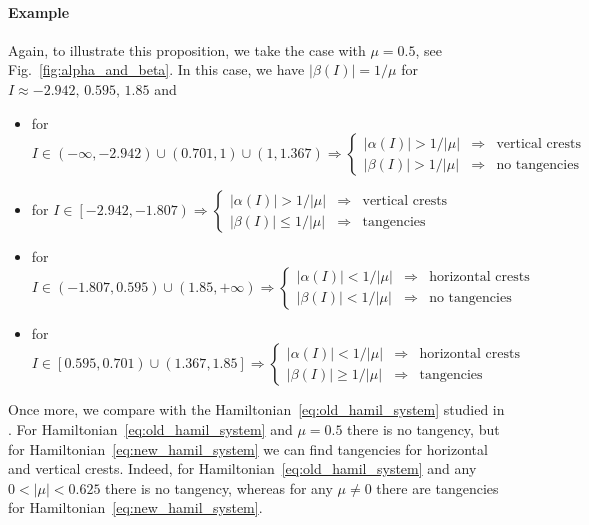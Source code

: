 \documentclass[a4paper,10pt]{article}
\theoremstyle{definition}
\begin{document}
\paragraph{Example} Again, to illustrate this proposition, we take the case with $\mu = 0.5$, see Fig.~\ref{fig:alpha_and_beta}.
In this case, we have $\left|\beta(I)\right| = 1/\mu$ for $I \approx -2.942,\, 0.595,\, 1.85$
and
\begin{itemize}
\item for $I \in (-\infty , -2.942)\cup \left(0.701 , 1\right)\cup(1 , 1.367)\Rightarrow \left\{\begin{matrix}
 \left|\alpha(I)\right| > 1/\left|\mu\right|& \Rightarrow  & \text{vertical crests} \\
\left|\beta(I)\right| > 1/\left|\mu\right| &  \Rightarrow & \text{no tangencies}
\end{matrix}\right. $

\item for $I \in \left[ -2.942 , -1.807 \right) \Rightarrow \left\{\begin{matrix}
 \left|\alpha(I)\right| > 1/\left|\mu\right|& \Rightarrow  & \text{vertical crests} \\
\left|\beta(I)\right| \leq 1/\left|\mu\right| & \Rightarrow & \text{tangencies}
\end{matrix}\right.$

\item for $I \in (-1.807 , 0.595 )\cup( 1.85 ,+\infty)\Rightarrow \left\{\begin{matrix}
 \left|\alpha(I)\right| < 1/\left|\mu\right|& \Rightarrow  & \text{horizontal crests} \\
\left|\beta(I)\right| < 1/\left|\mu\right| & \Rightarrow & \text{no tangencies}
\end{matrix}\right.$

\item for $I \in \left[0.595 , 0.701 \right)\cup \left( 1.367 , 1.85\right]\Rightarrow \left\{\begin{matrix}
 \left|\alpha(I)\right| < 1/\left|\mu\right|& \Rightarrow  & \text{horizontal crests} \\
\left|\beta(I)\right| \geq 1/\left|\mu\right| & \Rightarrow & \text{tangencies}
\end{matrix}\right.$
\end{itemize}

Once more, we compare with the Hamiltonian~\eqref{eq:old_hamil_system} studied in \cite{Delshams2017}.
For Hamiltonian~\eqref{eq:old_hamil_system} and $\mu = 0.5$ there is no tangency, but for Hamiltonian~\eqref{eq:new_hamil_system}
we can find tangencies for horizontal and vertical crests.
Indeed, for Hamiltonian~\eqref{eq:old_hamil_system} and any $0<\left|\mu\right| < 0.625$ there is no tangency,
whereas for any $\mu\neq 0$ there are tangencies for Hamiltonian~\eqref{eq:new_hamil_system}.
\end{document}
